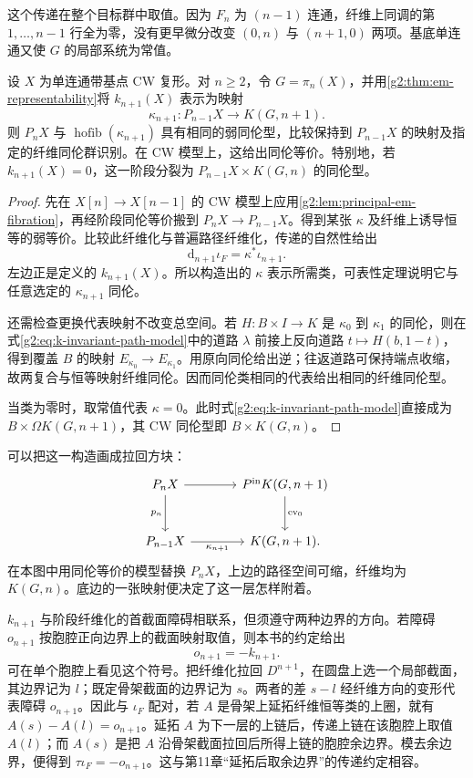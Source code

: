 这个传递在整个目标群中取值。因为 \(F_n\) 为 \((n-1)\) 连通，纤维上同调的第 \(1,\ldots,n-1\) 行全为零，没有更早微分改变 \((0,n)\) 与 \((n+1,0)\) 两项。基底单连通又使 \(G\) 的局部系统为常值。

\begin{theorem}\label{g2:thm:postnikov-k-reconstruction}
	设 \(X\) 为单连通带基点 CW 复形。对 \(n\ge2\)，令 \(G=\pi_n(X)\)，并用\cref{g2:thm:em-representability}将 \(k_{n+1}(X)\) 表示为映射
	\[
		\kappa_{n+1}:P_{n-1}X\longrightarrow K(G,n+1).
	\]
	则 \(P_nX\) 与 \(\operatorname{hofib}(\kappa_{n+1})\) 具有相同的弱同伦型，比较保持到 \(P_{n-1}X\) 的映射及指定的纤维同伦群识别。在 CW 模型上，这给出同伦等价。特别地，若 \(k_{n+1}(X)=0\)，这一阶段分裂为 \(P_{n-1}X\times K(G,n)\) 的同伦型。
\end{theorem}
\begin{proof}
	先在 \(X[n]\to X[n-1]\) 的 CW 模型上应用\cref{g2:lem:principal-em-fibration}，再经阶段同伦等价搬到 \(P_nX\to P_{n-1}X\)。得到某张 \(\kappa\) 及纤维上诱导恒等的弱等价。比较此纤维化与普遍路径纤维化，传递的自然性给出
	\[
		\mathrm d_{n+1}\iota_F=\kappa^*\iota_{n+1}.
	\]
	左边正是定义的 \(k_{n+1}(X)\)。所以构造出的 \(\kappa\) 表示所需类，可表性定理说明它与任意选定的 \(\kappa_{n+1}\) 同伦。

	还需检查更换代表映射不改变总空间。若 \(H:B\times I\to K\) 是 \(\kappa_0\) 到 \(\kappa_1\) 的同伦，则在式\eqref{g2:eq:k-invariant-path-model}中的道路 \(\lambda\) 前接上反向道路 \(t\mapsto H(b,1-t)\)，得到覆盖 \(B\) 的映射 \(E_{\kappa_0}\to E_{\kappa_1}\)。用原向同伦给出逆；往返道路可保持端点收缩，故两复合与恒等映射纤维同伦。因而同伦类相同的代表给出相同的纤维同伦型。

	当类为零时，取常值代表 \(\kappa=0\)。此时式\eqref{g2:eq:k-invariant-path-model}直接成为 \(B\times\Omega K(G,n+1)\)，其 CW 同伦型即 \(B\times K(G,n)\)。
\end{proof}

可以把这一构造画成拉回方块：
\[
	\begin{tikzcd}[column sep=large,row sep=large]
		P_nX\arrow[r]\arrow[d,"p_n"']&P^{\mathrm{in}}K(G,n+1)\arrow[d,"\operatorname{ev}_0"]\\
		P_{n-1}X\arrow[r,"\kappa_{n+1}"']&K(G,n+1).
	\end{tikzcd}
\]
在本图中用同伦等价的模型替换 \(P_nX\)，上边的路径空间可缩，纤维均为 \(K(G,n)\)。底边的一张映射便决定了这一层怎样附着。

\ProseParagraphBreak

\(k_{n+1}\) 与阶段纤维化的首截面障碍相联系，但须遵守两种边界的方向。若障碍 \(o_{n+1}\) 按胞腔正向边界上的截面映射取值，则本书的约定给出
\[
	o_{n+1}=-k_{n+1}.
\]
可在单个胞腔上看见这个符号。把纤维化拉回 \(D^{n+1}\)，在圆盘上选一个局部截面，其边界记为 \(l\)；既定骨架截面的边界记为 \(s\)。两者的差 \(s-l\) 经纤维方向的变形代表障碍 \(o_{n+1}\)。因此与 \(\iota_F\) 配对，若 \(A\) 是骨架上延拓纤维恒等类的上圈，就有 \(A(s)-A(l)=o_{n+1}\)。延拓 \(A\) 为下一层的上链后，传递上链在该胞腔上取值 \(A(l)\)；而 \(A(s)\) 是把 \(A\) 沿骨架截面拉回后所得上链的胞腔余边界。模去余边界，便得到 \(\tau\iota_F=-o_{n+1}\)。这与第11章“延拓后取余边界”的传递约定相容。

